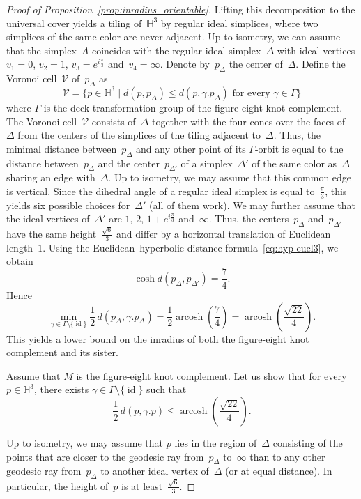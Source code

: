 \documentclass[11pt,reqno]{amsart}
\theoremstyle{definition}
\numberwithin{equation}{section}
\newcommand{\HH}{{\mathbb H}}
\DeclareMathOperator{\arcosh}{arcosh}
\DeclareMathOperator{\id}{id}
\numberwithin{equation}{section}
\begin{document}
\begin{proof}[Proof of Proposition~\ref{prop:inradius_orientable}]
Lifting this decomposition to the universal cover yields a tiling of~$\HH^3$ by regular ideal simplices, where two simplices of the same color are never adjacent.
Up to isometry, we can assume that the simplex~$A$ coincides with the regular ideal simplex~$\Delta$ with ideal vertices $v_1=0$, $v_2=1$, $v_3=e^{i \frac{\pi}{3}}$ and~$v_4=\infty$.
Denote by~$p_\Delta$ the center of~$\Delta$.
Define the Voronoi cell~$\mathcal{V}$ of~$p_\Delta$ as
\[
\mathcal{V}=\{ p \in \HH^3 \mid d(p,p_\Delta) \leq d(p,\gamma.p_\Delta) \mbox{ for every } \gamma \in \Gamma \}
\]
where $\Gamma$ is the deck transformation group of the figure-eight knot complement.
The Voronoi cell~$\mathcal{V}$ consists of~$\Delta$ together with the four cones over the faces of~$\Delta$ from the centers of the simplices of the tiling adjacent to~$\Delta$.
Thus, the minimal distance between~$p_\Delta$ and any other point of its $\Gamma$-orbit is equal to the distance between~$p_\Delta$ and the center~$p_{\Delta'}$ of a simplex~$\Delta'$ of the same color as~$\Delta$ sharing an edge with~$\Delta$.
Up to isometry, we may assume that this common edge is vertical.
Since the dihedral angle of a regular ideal simplex is equal to~$\frac{\pi}{3}$, this yields six possible choices for~$\Delta'$ (all of them work).
We may further assume that the ideal vertices of~$\Delta'$ are $1$, $2$, $1+e^{i \frac{\pi}{3}}$ and~$\infty$.
Thus, the centers~$p_\Delta$ and~$p_{\Delta'}$ have the same height~$\frac{\sqrt{6}}{3}$ and differ by a horizontal translation of Euclidean length~$1$.
Using the Euclidean--hyperbolic distance formula~\eqref{eq:hyp-eucl3}, we obtain
\[
\cosh d(p_\Delta,p_{\Delta'}) = \frac{7}{4}.
\]
Hence
\[
\min_{\gamma \in \Gamma \setminus \{ \id \}} \frac{1}{2} \, d(p_\Delta,\gamma.p_\Delta) = \frac{1}{2} \arcosh \left( \frac{7}{4} \right) = \arcosh \left( \frac{\sqrt{22}}{4} \right).
\]
This yields a lower bound on the inradius of both the figure-eight knot complement and its sister.

Assume that $M$ is the figure-eight knot complement.
Let us show that for every $p \in \HH^3$, there exists $\gamma \in \Gamma \setminus \{ \id \}$ such that 
\[
\frac{1}{2} \, d(p,\gamma.p) \leq \arcosh \left( \frac{\sqrt{22}}{4} \right).
\]

Up to isometry, we may assume that $p$ lies in the region of~$\Delta$ consisting of the points that are closer to the geodesic ray from~$p_\Delta$ to~$\infty$ than to any other geodesic ray from~$p_\Delta$ to another ideal vertex of~$\Delta$ (or at equal distance).
In particular, the height of~$p$ is at least~$\frac{\sqrt{6}}{3}$.


\end{proof}
\end{document}
